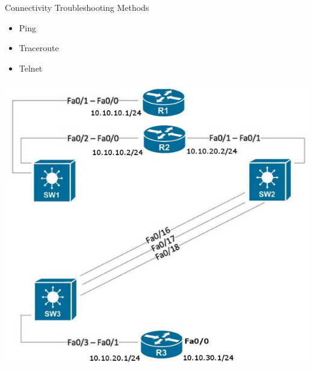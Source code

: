 \documentclass[pdflatex,compress,mathserif]{beamer}
\begin{document}
\begin{frame}{Connectivity Troubleshooting Methods}
	\begin{itemize}
		\item Ping
		\item Traceroute
		\item Telnet
	\end{itemize}
\end{frame}

\begin{frame}
	\begin{center}
		\includegraphics[height=0.8\textheight]{img/img03}
	\end{center}
\end{frame}
\end{document}
